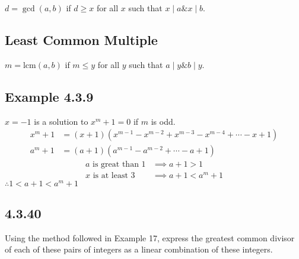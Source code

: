 \documentclass{article}
\begin{document}
$ d = \gcd(a, b) $ if $ d \geq x $ for all $ x $ such that $ x \mid a \& x \mid b $.

\subsection{Least Common Multiple}

$ m = \text{lcm}(a, b) $ if $ m \leq y $ for all $ y $ such that $ a \mid y \& b \mid y $.

\subsection{Example 4.3.9}

$ x = -1 $ is a solution to $ x^m + 1 = 0 $ if $ m $ is odd.
\begin{align*}
	x^m + 1 & = \left( x + 1 \right) \left( x^{m - 1} - x^{m - 2} + x^{m - 3} - x^{m - 4} + \cdots - x + 1 \right) \\
	a^m + 1 & = \left( a + 1 \right) \left( a^{m - 1} - a^{m - 2} + \cdots - a + 1 \right)
\end{align*}
\begin{align*}
	a \text{ is great than } 1 & \implies a + 1 > 1       \\
	x \text{ is at least } 3   & \implies a + 1 < a^m + 1
\end{align*}
$ \therefore 1 < a + 1 < a^m + 1 $

\subsection{4.3.40}

Using the method followed in Example 17, express the greatest common divisor of each of these pairs of integers as a linear combination of these integers.
\end{document}
